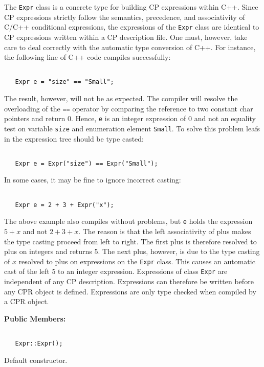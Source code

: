 \documentclass{article}
\begin{document}
The \texttt{Expr} class is a concrete type for building CP expressions
within C++. Since CP expressions strictly follow the semantics,
precedence, and associativity of C/C++ conditional expressions, the
expressions of the
\texttt{Expr} class are identical to CP expressions written within a CP
description file. One must, however, take care to deal correctly with
the automatic type conversion of C++. For instance, the following line
of C++ code compiles successfully:
\begin{verbatim}

   Expr e = "size" == "Small";

\end{verbatim}
The result, however, will not be as expected. The compiler will
resolve the overloading of the \texttt{==} operator by comparing the
reference to two constant char pointers and return 0. Hence,
\texttt{e} is an integer expression of 0 and not an equality
test on variable \texttt{size} and enumeration element \texttt{Small}.
To solve this problem leafs in the expression tree should be type casted:
\begin{verbatim}

   Expr e = Expr("size") == Expr("Small");

\end{verbatim}
In some cases, it may be fine to ignore incorrect casting:
\begin{verbatim}

   Expr e = 2 + 3 + Expr("x");

\end{verbatim}
The above example also compiles without problems, but \texttt{e} holds
the expression $5 + x$ and not $2 + 3 + x$. The reason is that the
left associativity of plus makes the type casting proceed from left to
right.  The first plus is therefore resolved to plus on integers and
returns 5. The next plus, however, is due to the type casting of $x$
resolved to plus on expressions on the \texttt{Expr} class. This
causes an automatic cast of the left 5 to an integer expression.
Expressions of class \texttt{Expr} are independent of any CP
description.  Expressions can therefore be written before any CPR
object is defined.  Expressions are only type checked when compiled by
a CPR object.

\vspace{1cm}
\noindent
{\bf Public Members:}

\noindent
\hrulefill

\begin{verbatim}

   Expr::Expr();

\end{verbatim}
Default constructor.
\end{document}
